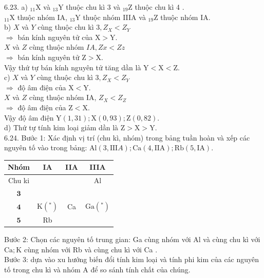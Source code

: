 \documentclass[10pt]{article}
\begin{document}
6.23. a) ${ }_{11} \mathrm{X}$ và ${ }_{13} \mathrm{Y}$ thuộc chu kì 3 và ${ }_{19} \mathrm{Z}$ thuộc chu kì 4 .\\
${ }_{11} \mathrm{X}$ thuộc nhóm IA, ${ }_{13} \mathrm{Y}$ thuộc nhóm IIIA và ${ }_{19} \mathrm{Z}$ thuộc nhóm IA.\\
b) $X$ và $Y$ cùng thuộc chu kì $3, Z_{X}<Z_{Y}$\\
$\Rightarrow$ bán kính nguyên tử của $\mathrm{X}>\mathrm{Y}$.\\
$X$ và $Z$ cùng thuộc nhóm $I A, Z x<Z z$\\
$\Rightarrow$ bán kính nguyên tử $\mathrm{Z}>\mathrm{X}$.\\
Vậy thứ tự bán kính nguyên tử tăng dần là $\mathrm{Y}<\mathrm{X}<\mathrm{Z}$.\\
c) $X$ và $Y$ cùng thuộc chu kì $3, Z_{X}<Z_{Y}$\\
$\Rightarrow$ độ âm điện của $\mathrm{X}<\mathrm{Y}$.\\
$X$ và $Z$ cùng thuộc nhóm IA, $Z_{X}<Z_{Z}$\\
$\Rightarrow$ độ âm điện của $\mathrm{Z}<\mathrm{X}$.\\
Vậy độ âm điện $\mathrm{Y}(1,31) ; \mathrm{X}(0,93) ; \mathrm{Z}(0,82)$.\\
d) Thứ tự tính kim loại giảm dần là $\mathrm{Z}>\mathrm{X}>\mathrm{Y}$.\\
6.24. Bước 1: Xác định vị trí (chu kì, nhóm) trong bảng tuần hoàn và xếp các nguyên tố vào trong bảng: $\mathrm{Al}(3, \mathrm{III} A) ; \mathrm{Ca}(4, \mathrm{IIA}) ; \mathrm{Rb}(5, \mathrm{IA})$.

\begin{center}
\begin{tabular}{|c|c|c|c|}
\hline
Nhóm & IA & IIA & IIIA \\
\hline
Chu ki &  &  & Al \\
\hline
$\mathbf{3}$ &  &  &  \\
\hline
$\mathbf{4}$ & $\mathrm{K}\left({ }^{*}\right)$ & Ca & $\mathrm{Ga}\left({ }^{*}\right)$ \\
\hline
$\mathbf{5}$ & Rb &  &  \\
\hline
\end{tabular}
\end{center}

Bước 2: Chọn các nguyên tố trung gian: Ga cùng nhóm với Al và cùng chu kì với $\mathrm{Ca} ; \mathrm{K}$ cùng nhóm với Rb và cùng chu kì với Ca .\\
Bước 3: dựa vào xu hướng biến đổi tính kim loại và tính phi kim của các nguyên tố trong chu kì và nhóm A để so sánh tính chất của chúng.
\end{document}
